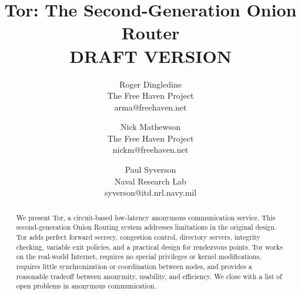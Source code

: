 \documentclass[times,10pt,twocolumn]{article}
\begin{document}

\title{Tor: The Second-Generation Onion Router\\DRAFT VERSION}

\author{Roger Dingledine \\ The Free Haven Project \\ arma@freehaven.net \and
Nick Mathewson \\ The Free Haven Project \\ nickm@freehaven.net \and
Paul Syverson \\ Naval Research Lab \\ syverson@itd.nrl.navy.mil}

\maketitle
\thispagestyle{empty}

\begin{abstract}
We present Tor, a circuit-based low-latency anonymous communication
service. This second-generation Onion Routing system addresses limitations
in the original design. Tor adds perfect forward secrecy, congestion
control, directory servers, integrity checking, variable exit policies,
and a practical design for rendezvous points. Tor works on the real-world
Internet, requires no special privileges or kernel modifications, requires
little synchronization or coordination between nodes, and provides a
reasonable tradeoff between anonymity, usability, and efficiency. We
close with a list of open problems in anonymous communication.
\end{abstract}



\label{sec:intro}
\end{document}
